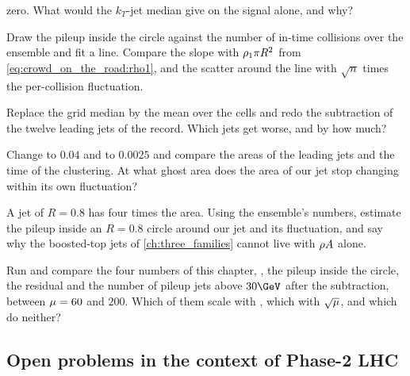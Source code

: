 \begin{exercises}
  zero. What would the $k_T$-jet median give on the signal alone, and why?
\item Draw the pileup inside the circle against the number of in-time
  collisions over the ensemble and fit a line. Compare the slope with
  $\rho_1\pi R^2$ from \cref{eq:crowd_on_the_road:rho1}, and the
  scatter around the line with $\sqrt{n}$ times the per-collision
  fluctuation.
\item Replace the grid median by the mean over the cells and redo the
  subtraction of the twelve leading jets of the record. Which jets get
  worse, and by how much?
\item Change  to $0.04$ and to $0.0025$ and compare the
  areas of the leading jets and the time of the clustering. At what ghost
  area does the area of our jet stop changing within its own fluctuation?
\item A jet of $R=0.8$ has four times the area. Using the ensemble's
  numbers, estimate the pileup inside an $R=0.8$ circle around our jet and
  its fluctuation, and say why the boosted-top jets of
  \cref{ch:three_families} cannot live with $\rho A$ alone.
\item Run  and compare the four numbers of
  this chapter, \rhoPU, the pileup inside the circle, the residual and
  the number of pileup jets above $30\GeV$ after the subtraction, between
  $\mu=60$ and $200$. Which of them scale with \mup, which with
  $\sqrt{\mu}$, and which do neither?
\end{exercises}

\subsection*{Open problems in the context of Phase-2 LHC}
\label{sec:crowd_on_the_road:open_problems}

